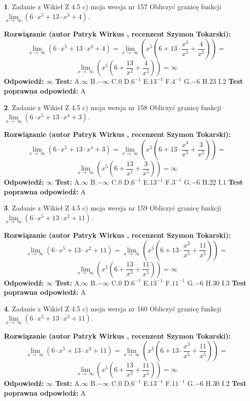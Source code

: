 \documentclass[12pt, a4paper]{article}
\theoremstyle{definition} %
\newtheorem{zad}{}
\newcommand{\zadStart}[1]{\begin{zad}#1\newline}
\newcommand{\zadStop}{\end{zad}}
\newcommand{\rozwStart}[2]{\noindent \textbf{Rozwiązanie (autor #1 , recenzent #2): }\newline}
\newcommand{\rozwStop}{\newline}
\newcommand{\odpStart}{\noindent \textbf{Odpowiedź:}\newline}
\newcommand{\odpStop}{\newline}
\newcommand{\testStart}{\noindent \textbf{Test:}\newline}
\newcommand{\testStop}{\newline}
\newcommand{\kluczStart}{\noindent \textbf{Test poprawna odpowiedź:}\newline}
\newcommand{\kluczStop}{\newline}
\begin{document}
\zadStart{Zadanie z Wikieł Z 4.5 c) moja wersja nr 157}
Obliczyć granicę funkcji  $\lim\limits_{x\to\ \infty}(6 \cdot x^{5}+13 \cdot x^{3}+4)$.
\zadStop
\rozwStart{Patryk Wirkus}{Szymon Tokarski}
$$\lim\limits_{x\to\ \infty}(6 \cdot x^{5}+13 \cdot x^{3}+4) = \lim\limits_{x\to\ \infty}(x^{5}(6 +13 \cdot \frac{x^{3}}{x^{5}}+\frac{4}{x^{5}})) =$$ $$\lim\limits_{x\to\ \infty}(x^{5}(6 +\frac{13}{x^{2}}+\frac{4}{x^{5}})) =\infty$$
\rozwStop
\odpStart
$\infty$
\odpStop
\testStart
A.$\infty$ B.$-\infty$ C.$0$ D.$6^{-1}$ E.$13^{-1}$
F.$4^{-1}$ G.$-6$
H.$23$
I.$2$
\testStop
\kluczStart
A
\kluczStop



\zadStart{Zadanie z Wikieł Z 4.5 c) moja wersja nr 158}
Obliczyć granicę funkcji  $\lim\limits_{x\to\ \infty}(6 \cdot x^{5}+13 \cdot x^{4}+3)$.
\zadStop
\rozwStart{Patryk Wirkus}{Szymon Tokarski}
$$\lim\limits_{x\to\ \infty}(6 \cdot x^{5}+13 \cdot x^{4}+3) = \lim\limits_{x\to\ \infty}(x^{5}(6 +13 \cdot \frac{x^{4}}{x^{5}}+\frac{3}{x^{5}})) =$$ $$\lim\limits_{x\to\ \infty}(x^{5}(6 +\frac{13}{x^{1}}+\frac{3}{x^{5}})) =\infty$$
\rozwStop
\odpStart
$\infty$
\odpStop
\testStart
A.$\infty$ B.$-\infty$ C.$0$ D.$6^{-1}$ E.$13^{-1}$
F.$3^{-1}$ G.$-6$
H.$22$
I.$1$
\testStop
\kluczStart
A
\kluczStop



\zadStart{Zadanie z Wikieł Z 4.5 c) moja wersja nr 159}
Obliczyć granicę funkcji  $\lim\limits_{x\to\ \infty}(6 \cdot x^{5}+13 \cdot x^{2}+11)$.
\zadStop
\rozwStart{Patryk Wirkus}{Szymon Tokarski}
$$\lim\limits_{x\to\ \infty}(6 \cdot x^{5}+13 \cdot x^{2}+11) = \lim\limits_{x\to\ \infty}(x^{5}(6 +13 \cdot \frac{x^{2}}{x^{5}}+\frac{11}{x^{5}})) =$$ $$\lim\limits_{x\to\ \infty}(x^{5}(6 +\frac{13}{x^{3}}+\frac{11}{x^{5}})) =\infty$$
\rozwStop
\odpStart
$\infty$
\odpStop
\testStart
A.$\infty$ B.$-\infty$ C.$0$ D.$6^{-1}$ E.$13^{-1}$
F.$11^{-1}$ G.$-6$
H.$30$
I.$3$
\testStop
\kluczStart
A
\kluczStop



\zadStart{Zadanie z Wikieł Z 4.5 c) moja wersja nr 160}
Obliczyć granicę funkcji  $\lim\limits_{x\to\ \infty}(6 \cdot x^{5}+13 \cdot x^{3}+11)$.
\zadStop
\rozwStart{Patryk Wirkus}{Szymon Tokarski}
$$\lim\limits_{x\to\ \infty}(6 \cdot x^{5}+13 \cdot x^{3}+11) = \lim\limits_{x\to\ \infty}(x^{5}(6 +13 \cdot \frac{x^{3}}{x^{5}}+\frac{11}{x^{5}})) =$$ $$\lim\limits_{x\to\ \infty}(x^{5}(6 +\frac{13}{x^{2}}+\frac{11}{x^{5}})) =\infty$$
\rozwStop
\odpStart
$\infty$
\odpStop
\testStart
A.$\infty$ B.$-\infty$ C.$0$ D.$6^{-1}$ E.$13^{-1}$
F.$11^{-1}$ G.$-6$
H.$30$
I.$2$
\testStop
\kluczStart
A
\kluczStop
\end{document}
